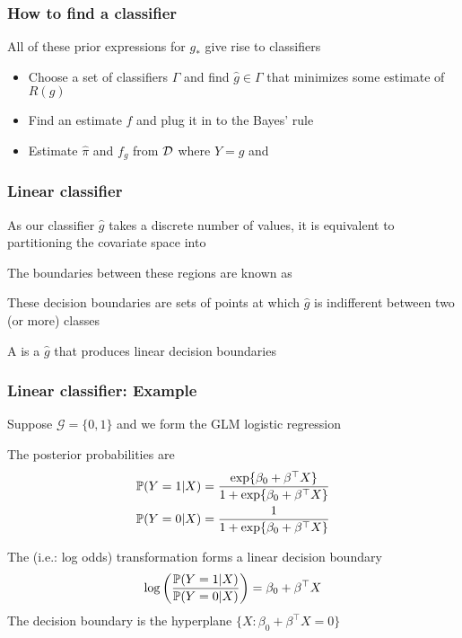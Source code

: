 \documentclass[12pt]{beamer}
\begin{document}
\begin{frame}
\frametitle{How to find a classifier}
All of these prior expressions for $g_*$ give rise to classifiers
\begin{itemize}
\item {}  Choose a set of classifiers $\Gamma$ and find
$\hat{g} \in \Gamma$ that minimizes some estimate of $R(g)$

\item  {}  Find an estimate $\hat{f}$ and plug it in to the Bayes' rule
\item  {} Estimate $\hat{\pi}$ and $f_g$ from $\data$ where $Y =g$ and 
\end{itemize}
\end{frame}


\begin{frame}
\frametitle{Linear classifier}
As our classifier $\hat{g}$ takes a discrete number of values, it is equivalent
to partitioning the covariate space into 

\vsp
The boundaries between these regions are known as 

\vsp
These decision boundaries are sets of points at which $\hat{g}$ is indifferent between 
two (or more) classes

\vsp
A  is a $\hat{g}$ that produces linear decision boundaries

\end{frame}

\begin{frame}[fragile]
\frametitle{Linear classifier: Example}
Suppose $\mathcal{G} = \{ 0,1\}$ and we form the GLM logistic regression

\vsp
The posterior probabilities are
\begin{align*}
\P(Y = 1 | X)  & = \frac{\exp\{\beta_0 + \beta^{\top}X\}}{1 + \exp\{\beta_0 + \beta^{\top}X\}} \\
\P(Y = 0 | X) & = \frac{1}{1 + \exp\{\beta_0 + \beta^{\top}X\}}
\end{align*}

The  (i.e.: log odds) transformation forms a linear decision boundary
\[
\log\left( \frac{\P(Y = 1 | X)}{\P(Y = 0 | X) } \right) = \beta_0 + \beta^{\top} X
\]
The decision boundary is the hyperplane $\{X : \beta_0 + \beta^{\top} X = 0\}$

\end{frame}
\end{document}
